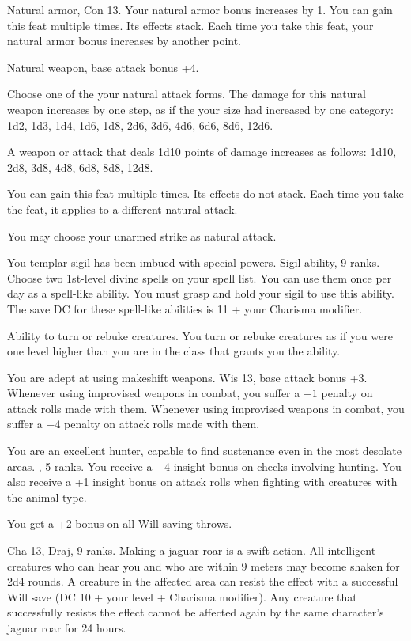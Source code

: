 {}
{Natural armor, Con 13.}
{Your natural armor bonus increases by 1.}
{}
{You can gain this feat multiple times. Its effects stack. Each time you take this feat, your natural armor bonus increases by another point.}

{}
{Natural weapon, base attack bonus +4.}
{Choose one of the your natural attack forms. The damage for this natural weapon increases by one step, as if the your size had increased by one category: 1d2, 1d3, 1d4, 1d6, 1d8, 2d6, 3d6, 4d6, 6d6, 8d6, 12d6.

A weapon or attack that deals 1d10 points of damage increases as follows: 1d10, 2d8, 3d8, 4d8, 6d8, 8d8, 12d8.}
{}
{You can gain this feat multiple times. Its effects do not stack. Each time you take the feat, it applies to a different natural attack.

You may choose your unarmed strike as natural attack.}

{You templar sigil has been imbued with special powers.}
{Sigil ability,  9 ranks.}
{Choose two 1st-level divine spells on your spell list. You can use them once per day as a spell-like ability. You must grasp and hold your sigil to use this ability. The save DC for these spell-like abilities is 11 + your Charisma modifier.}{}{}

{Ability to turn or rebuke creatures.}
{You turn or rebuke creatures as if you were one level higher than you are in the class that grants you the ability.}

{You are adept at using makeshift weapons.}
{Wis 13, base attack bonus +3.}
{Whenever using improvised weapons in combat, you suffer a $-1$ penalty on attack rolls made with them.}
{Whenever using improvised weapons in combat, you suffer a $-4$ penalty on attack rolls made with them.}{}

{You are an excellent hunter, capable to find sustenance even in the most desolate areas.}
{,  5 ranks.}
{You receive a +4 insight bonus on  checks involving hunting. You also receive a +1 insight bonus on attack rolls when fighting with creatures with the animal type.}{}{}

{You get a +2 bonus on all Will saving throws.}

{Cha 13, Draj,  9 ranks.}
{Making a jaguar roar is a swift action. All intelligent creatures who can hear you and who are within 9 meters may become shaken for 2d4 rounds. A creature in the affected area can resist the effect with a successful Will save (DC 10 + your level + Charisma modifier). Any creature that successfully resists the effect cannot be affected again by the same character's jaguar roar for 24 hours.}

